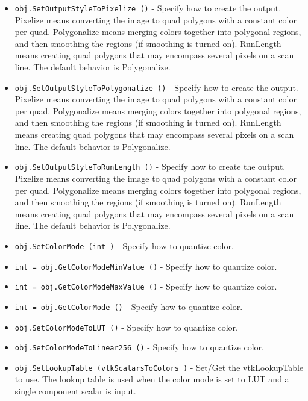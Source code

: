 \begin{itemize}
\item  \verb|obj.SetOutputStyleToPixelize ()| -  Specify how to create the output. Pixelize means converting the image
 to quad polygons with a constant color per quad. Polygonalize means
 merging colors together into polygonal regions, and then smoothing
 the regions (if smoothing is turned on). RunLength means creating
 quad polygons that may encompass several pixels on a scan line. The
 default behavior is Polygonalize.

\item  \verb|obj.SetOutputStyleToPolygonalize ()| -  Specify how to create the output. Pixelize means converting the image
 to quad polygons with a constant color per quad. Polygonalize means
 merging colors together into polygonal regions, and then smoothing
 the regions (if smoothing is turned on). RunLength means creating
 quad polygons that may encompass several pixels on a scan line. The
 default behavior is Polygonalize.

\item  \verb|obj.SetOutputStyleToRunLength ()| -  Specify how to create the output. Pixelize means converting the image
 to quad polygons with a constant color per quad. Polygonalize means
 merging colors together into polygonal regions, and then smoothing
 the regions (if smoothing is turned on). RunLength means creating
 quad polygons that may encompass several pixels on a scan line. The
 default behavior is Polygonalize.

\item  \verb|obj.SetColorMode (int )| -  Specify how to quantize color.

\item  \verb|int = obj.GetColorModeMinValue ()| -  Specify how to quantize color.

\item  \verb|int = obj.GetColorModeMaxValue ()| -  Specify how to quantize color.

\item  \verb|int = obj.GetColorMode ()| -  Specify how to quantize color.

\item  \verb|obj.SetColorModeToLUT ()| -  Specify how to quantize color.

\item  \verb|obj.SetColorModeToLinear256 ()| -  Specify how to quantize color.

\item  \verb|obj.SetLookupTable (vtkScalarsToColors )| -  Set/Get the vtkLookupTable to use. The lookup table is used when the
 color mode is set to LUT and a single component scalar is input.


\end{itemize}
